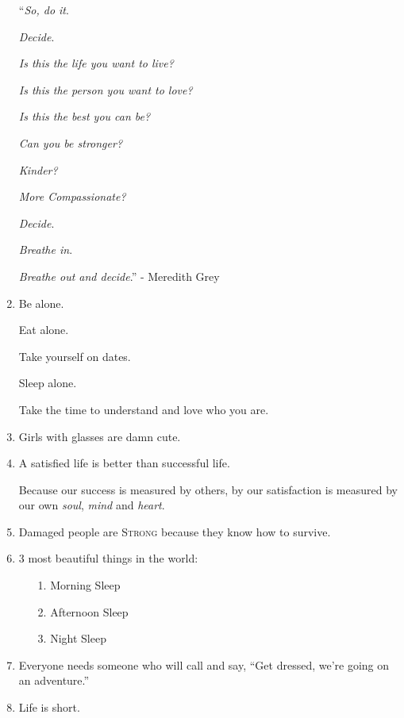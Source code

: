 \documentclass{article}
\numberwithin{equation}{section}
\begin{document}
\begin{enumerate}
    ``\textit{So, do it}.
    
    \textit{Decide}.
    
    \textit{Is this the life you want to live?}
    
    \textit{Is this the person you want to love?}
    
    \textit{Is this the best you can be?}
    
    \textit{Can you be stronger?}
    
    \textit{Kinder?}
    
    \textit{More Compassionate?}
    
    \textit{Decide}.
    
    \textit{Breathe in}.
    
    \textit{Breathe out and decide}.'' - Meredith Grey
    \item Be alone.
    
    Eat alone.
    
    Take yourself on dates.
    
    Sleep alone.
    
    Take the time to understand and love who you are.
    \item Girls with glasses are damn cute.
    \item A satisfied life is better than successful life.
    
    Because our success is measured by others, by our satisfaction is measured by our own \textit{soul}, \textit{mind} and \textit{heart}.
    \item Damaged people are \textsc{Strong} because they know how to survive.
    \item 3 most beautiful things in the world:
    \begin{itemize}
        \item[1.] Morning Sleep
        \item[2.] Afternoon Sleep
        \item[3.] Night Sleep
    \end{itemize}
    \item Everyone needs someone who will call and say, ``Get dressed, we're going on an adventure.''
    \item Life is short.
    

\end{enumerate}
\end{document}
